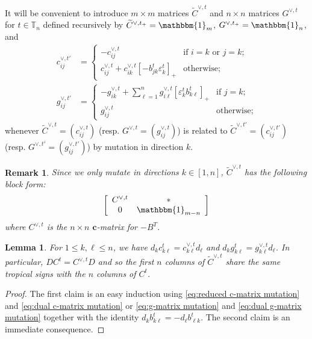 \documentclass{amsart}
\newtheorem{lemma}[theorem]{Lemma}
\newtheorem{remark}[theorem]{Remark}
\numberwithin{theorem}{section}
\newcommand{\bfc}{{\boldsymbol{c}}}
\newcommand{\TT}{\mathbb{T}}
\newcommand{\bOne}{\mathbbm{1}}
\begin{document}
  It will be convenient to introduce $m\times m$ matrices $\widetilde C^{\vee,t}$ and $n\times n$ matrices $G^{\vee,t}$ for $t\in\TT_n$ defined recursively by $\widetilde C^{\vee,t_+}=\bOne_m$, $G^{\vee,t_+}=\bOne_n$, and 
  \begin{align}
    \label{eq:dual c-matrix mutation}
    c^{\vee,t'}_{ij} &= \begin{cases} -c^{\vee,t}_{ij} & \text{if $i=k$ or $j=k$;}\\ c^{\vee,t}_{ij} + c^{\vee,t}_{ik} [-b^t_{jk} \varepsilon^t_k]_+ & \text{otherwise;} \end{cases}\\
    \label{eq:dual g-matrix mutation}
    g^{\vee,t'}_{ij} &= \begin{cases} -g^{\vee,t}_{ik} + \sum\limits_{\ell=1}^n g^{\vee,t}_{i \ell} [\varepsilon^t_k b^t_{k \ell}]_+ & \text{if $j=k$;}\\ g^{\vee,t}_{ij} & \text{otherwise;} \end{cases}
  \end{align}
  whenever $\widetilde C^{\vee,t}=(c^{\vee,t}_{ij})$ (resp. $G^{\vee,t}=(g^{\vee,t}_{ij})$) is related to $\widetilde C^{\vee,t'}=(c^{\vee,t'}_{ij})$ (resp. $G^{\vee,t'}=(g^{\vee,t'}_{ij})$) by mutation in direction $k$.
  \begin{remark}
    \label{rem:dual c-matrix structure}
    Since we only mutate in directions $k\in[1,n]$, $\widetilde C^{\vee,t}$ has the following block form:
    \[\left[\begin{array}{cc} C^{\vee,t} & *\\ 0 & \bOne_{m-n}\end{array}\right]\]
    where $C^{\vee,t}$ is the $n\times n$ $\bfc$-matrix for $-B^T$.
  \end{remark}
  \begin{lemma}
    \label{le:tropical signs}
    For $1\le k,\ell\le n$, we have $d_k c^t_{k\ell} = c^{\vee,t}_{k\ell} d_\ell $ and $d_k g^t_{k\ell} = g^{\vee,t}_{k\ell} d_\ell$.
    In particular, $D C^t = C^{\vee,t} D$ and so the first $n$ columns of $\widetilde C^{\vee,t}$ share the same tropical signs with the $n$ columns of $C^t$.
  \end{lemma}
  \begin{proof}
    The first claim is an easy induction using \eqref{eq:reduced c-matrix mutation} and \eqref{eq:dual c-matrix mutation} or \eqref{eq:g-matrix mutation} and \eqref{eq:dual g-matrix mutation} together with the identity $d_k b^t_{k\ell} = - d_\ell b^t_{\ell k}$.
    The second claim is an immediate consequence.
  \end{proof}
\end{document}
